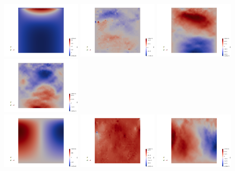 \begin{center}
\includegraphics[width=4cm]{python_codes/fieldstone_87/results/experiment_00/du_00}
\includegraphics[width=4cm]{python_codes/fieldstone_87/results/experiment_00/du_01}
\includegraphics[width=4cm]{python_codes/fieldstone_87/results/experiment_00/du_02}
\includegraphics[width=4cm]{python_codes/fieldstone_87/results/experiment_00/du_03}\\
\includegraphics[width=4cm]{python_codes/fieldstone_87/results/experiment_00/dv_00}
\includegraphics[width=4cm]{python_codes/fieldstone_87/results/experiment_00/dv_01}
\includegraphics[width=4cm]{python_codes/fieldstone_87/results/experiment_00/dv_02}

\end{center}
